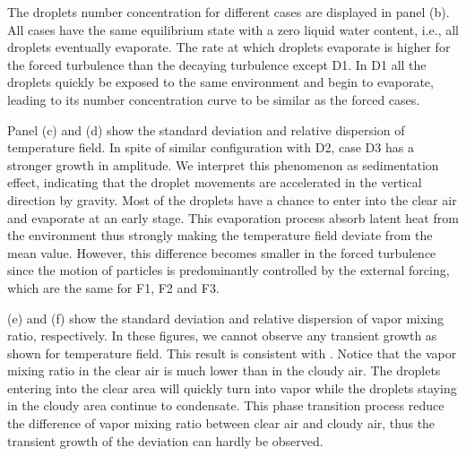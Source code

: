 The droplets number concentration for different cases are displayed in panel
(b). All cases have the same equilibrium state with a zero liquid water
content, i.e., all droplets eventually evaporate. The rate at which droplets
evaporate is higher for the forced turbulence than the decaying turbulence
except D1. In D1 all the droplets quickly be exposed to the same environment
and begin to evaporate, leading to its number concentration curve to be similar
as the forced cases.

Panel (c) and (d) show the standard deviation and relative dispersion of
temperature field. In spite of similar configuration with D2, case D3 has a
stronger growth in amplitude. We interpret this phenomenon as sedimentation
effect, indicating that the droplet movements are accelerated in the vertical
direction by gravity. Most of the droplets have a chance to enter into the
clear air and evaporate at an early stage. This evaporation process absorb
latent heat from the environment thus strongly making the temperature field
deviate from the mean value. However, this difference becomes smaller in the
forced turbulence since the motion of particles is predominantly controlled by
the external forcing, which are the same for F1, F2 and F3.

 (e) and (f) show the standard deviation and relative
dispersion of vapor mixing ratio, respectively. In these figures, we cannot
observe any transient growth as shown for temperature field. This result is
consistent with \cite{Kumar2014Lagrangian}. Notice that the vapor mixing ratio in the clear
air is much lower than in the cloudy air. The droplets entering into the clear
area will quickly turn into vapor while the droplets staying in the cloudy area
continue to condensate. This phase transition process reduce the difference of
vapor mixing ratio between clear air and cloudy air, thus the transient growth
of the deviation can hardly be observed.

